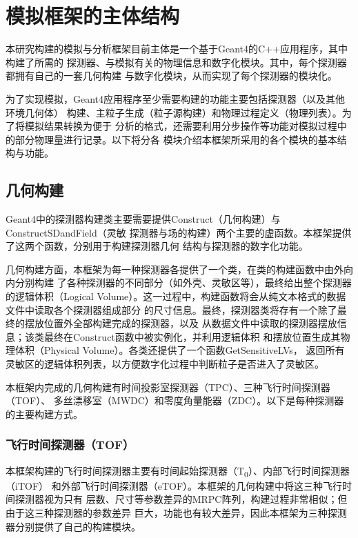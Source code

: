 \documentclass[bachelor,openany,oneside,color]{buaathesis}
\def\TZ{T\textsubscript{0}}
\begin{document}

\chapter{模拟框架的主体结构}

本研究构建的模拟与分析框架目前主体是一个基于Geant4的C++应用程序，其中构建了所需的
探测器、与模拟有关的物理信息和数字化模块。其中，每个探测器都拥有自己的一套几何构建
与数字化模块，从而实现了每个探测器的模块化。

为了实现模拟，Geant4应用程序至少需要构建的功能主要包括探测器（以及其他环境几何体）
构建、主粒子生成（粒子源构建）和物理过程定义（物理列表）。为了将模拟结果转换为便于
分析的格式，还需要利用分步操作等功能对模拟过程中的部分物理量进行记录。以下将分各
模块介绍本框架所采用的各个模块的基本结构与功能。

\section{几何构建}

Geant4中的探测器构建类主要需要提供Construct（几何构建）与ConstructSDandField（灵敏
探测器与场的构建）两个主要的虚函数。本框架提供了这两个函数，分别用于构建探测器几何
结构与探测器的数字化功能。

几何构建方面，本框架为每一种探测器各提供了一个类，在类的构建函数中由外向内分别构建
了各种探测器的不同部分（如外壳、灵敏区等），最终给出整个探测器的逻辑体积（Logical
Volume）。这一过程中，构建函数将会从纯文本格式的数据文件中读取各个探测器组成部分
的尺寸信息。最终，探测器类将存有一个除了最终的摆放位置外全部构建完成的探测器，以及
从数据文件中读取的探测器摆放信息；该类最终在Construct函数中被实例化，并利用逻辑体积
和摆放位置生成其物理体积（Physical Volume）。各类还提供了一个函数GetSensitiveLVs，
返回所有灵敏区的逻辑体积列表，以方便数字化过程中判断粒子是否进入了灵敏区。

本框架内完成的几何构建有时间投影室探测器（TPC）、三种飞行时间探测器（TOF）、
多丝漂移室（MWDC）和零度角量能器（ZDC）。以下是每种探测器的主要构建方式。

\subsection{飞行时间探测器（TOF）}

本框架构建的飞行时间探测器主要有时间起始探测器（\TZ）、内部飞行时间探测器（iTOF）
和外部飞行时间探测器（eTOF）。本框架的几何构建中将这三种飞行时间探测器视为只有
层数、尺寸等参数差异的MRPC阵列，构建过程非常相似；但由于这三种探测器的参数差异
巨大，功能也有较大差异，因此本框架为三种探测器分别提供了自己的构建模块。
\end{document}

